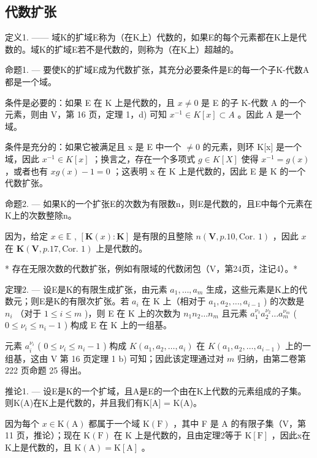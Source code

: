 \subsection{代数扩张}

定义1. —— 域K的扩域E称为（在K上）代数的，如果E的每个元素都在K上是代数的。域K的扩域E若不是代数的，则称为（在K上）超越的。

命题1. --- 要使K的扩域E成为代数扩张，其充分必要条件是E的每一个子K-代数A都是一个域。

条件是必要的：如果 E 在 K 上是代数的，且 \(x \neq 0\) 是 E 的子 K-代数 A 的一个元素，则由 V，第 16 页，定理 1，d) 可知 \(x^{-1} \in K[x] \subset A\) 。因此 A 是一个域。

条件是充分的：如果它被满足且 x 是 E 中一个 \(\neq 0\) 的元素，则环 K{[}x{]} 是一个域，因此 \(x^{-1} \in K[x]\) ；换言之，存在一个多项式 \(g \in K[X]\) 使得 \(x^{-1} = g(x)\) ，或者也有 \(xg(x) - 1 = 0\) ；这表明 x 在 K 上是代数的，因此 E 是 K 的一个代数扩张。

命题2. --- 如果K的一个扩张E的次数为有限数n，则E是代数的，且E中每个元素在K上的次数整除n。

因为，给定 \(x \in \mathbb{E}\) , \([\mathbf{K}(x): \mathbf{K}]\) 是有限的且整除 \(n(\mathbf{V}, p. 10, \text{Cor. } 1)\) ，因此 \(x\) 在 \(\mathbf{K}(\mathbf{V}, p. 17, \text{Cor. } 1)\) 上是代数的。

* 存在无限次数的代数扩张，例如有限域的代数闭包（V，第24页，注记4）。*

定理2. --- 设E是K的有限生成扩张，由元素 \(a_1, \ldots, a_m\) 生成，这些元素是K上的代数元；则E是K的有限次扩张。若 \(a_i\) 在 K 上（相对于 \(a_1, a_2, \ldots, a_{i-1}\) ) 的次数是 \(n_i\) （对于 \(1 \leq i \leq m\) )，则 E 在 K 上的次数为 \(n_1 n_2 \ldots n_m\) 且元素 \(a_1^{\nu_1} a_2^{\nu_2} \ldots a_m^{\nu_m}\) ( \(0 \leq \nu_i \leq n_i - 1\) ) 构成 E 在 K 上的一组基。

元素 \(a_i^{\nu_i}\) ( \(0 \leqslant \nu_i \leqslant n_i - 1\) ) 构成 \(K(a_1, a_2, \ldots, a_i)\) 在 \(K(a_1, a_2, \ldots, a_{i-1})\) 上的一组基，这由 V 第 16 页定理 1 b) 可知；因此该定理通过对 \(m\) 归纳，由第二卷第 222 页命题 25 得出。

推论1. --- 设E是K的一个扩域，且A是E的一个由在K上代数的元素组成的子集。则K(A)在K上是代数的，并且我们有K{[}A{]} = K(A)。

因为每个 \(x \in \mathrm{K}(\mathrm{A})\) 都属于一个域 \(\mathrm{K}(\mathrm{F})\) ，其中 F 是 A 的有限子集（V，第 11 页，推论）；现在 \(\mathrm{K}(\mathrm{F})\) 在 K 上是代数的，且由定理2等于 \(\mathrm{K}[\mathrm{F}]\) ，因此x在K上是代数的，且 \(\mathrm{K}(\mathrm{A}) = \mathrm{K}[\mathrm{A}]\) 。

